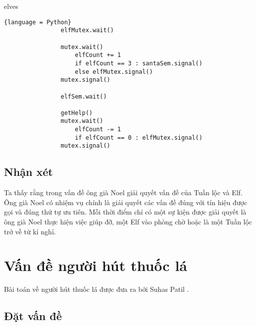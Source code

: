 \documentclass[a4paper]{article}
\begin{document}
    
    \begin{center}
        elves
        \begin{tcolorbox}
            \begin{lstlisting}{language = Python}
                elfMutex.wait()

                mutex.wait()
                    elfCount += 1
                    if elfCount == 3 : santaSem.signal()
                    else elfMutex.signal()
                mutex.signal()

                elfSem.wait()

                getHelp()
                mutex.wait()
                    elfCount -= 1
                    if elfCount == 0 : elfMutex.signal()
                mutex.signal()
            \end{lstlisting}
        
        \end{tcolorbox}
    \end{center}
    
    \subsection{Nhận xét}
    
    Ta thấy rằng trong vấn đề ông già Noel giải quyết vấn đề của Tuần lộc và Elf. Ông già Noel có nhiệm vụ chính là giải quyết các vấn đề đúng với tín hiệu được gọi và đúng thứ tự ưu tiên. Mỗi thời điểm chỉ có một sự kiện được giải quyết là ông già Noel thực hiện việc giúp đỡ, một Elf vào phòng chờ hoặc là một Tuần lộc trở về từ kỉ nghỉ.



	
	\section{Vấn đề người hút thuốc lá}
	Bài toán về người hút thuốc lá được đưa ra bởi Suhas Patil \cite{littlebook4}.
	\subsection{Đặt vấn đề}
	
\end{document}
